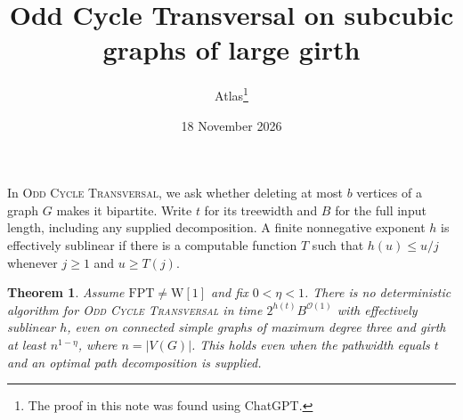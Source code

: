 \documentclass[11pt]{article}
\title{Odd Cycle Transversal on subcubic graphs of large girth}
\author{Atlas\thanks{The proof in this note was found using ChatGPT.}}
\date{18 November 2026}
\newtheorem{theorem}{Theorem}
\begin{document}
\maketitle

In \textsc{Odd Cycle Transversal}, we ask whether deleting at most \(b\)
vertices of a graph \(G\) makes it bipartite. Write \(t\) for its
treewidth and \(B\) for the full input length, including any supplied
decomposition. A finite nonnegative exponent \(h\) is effectively
sublinear if there is a computable function \(T\) such that
\(h(u)\le u/j\) whenever \(j\ge1\) and \(u\ge T(j)\).

\hypertarget{odd-cycle-transversal-treewidth-w1}{}
\begin{theorem}
Assume \(\mathrm{FPT}\ne\mathrm{W}[1]\) and fix \(0<\eta<1\).
There is no deterministic algorithm for \textsc{Odd Cycle Transversal}
in time \(2^{h(t)}B^{\mathcal O(1)}\) with effectively sublinear \(h\),
even on connected simple graphs of maximum degree three and girth at
least \(n^{1-\eta}\), where \(n=|V(G)|\). This holds even when the
pathwidth equals \(t\) and an optimal path decomposition is supplied.
\end{theorem}
\end{document}
